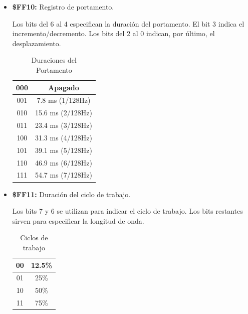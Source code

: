 	\begin{itemize}
		\item \textbf{\$FF10:} Registro de portamento.
	
		Los bits del 6 al 4 especifican la duración del portamento. El bit 3 indica el incremento/decremento.	Los bits del 2 al 0 indican, por último, el desplazamiento.
		
		\begin{table}[h!]
			\centering
			\begin{tabular}{|c|l|l|l|c|}
				\hline
				\multicolumn{4}{|c|}{000}       & Apagado                 				\\ \hline
				\multicolumn{4}{|c|}{001}       & 7.8 ms  (1/128Hz)                 				\\ \hline
				\multicolumn{4}{|c|}{010}       & 15.6 ms (2/128Hz) 					\\ \hline
				\multicolumn{4}{|c|}{011}       & 23.4 ms (3/128Hz) 					\\ \hline
				\multicolumn{4}{|c|}{100} 		& 31.3 ms (4/128Hz)              				\\ \hline
				\multicolumn{4}{|c|}{101} 		& 39.1 ms (5/128Hz) 					\\ \hline
				\multicolumn{4}{|c|}{110} 		& 46.9 ms (6/128Hz) 					\\ \hline
				\multicolumn{4}{|c|}{111} 		& 54.7 ms (7/128Hz) 					\\ \hline
			\end{tabular}
			\caption{Duraciones del Portamento}
			\label{table:portamento}
		\end{table}
		
		\item \textbf{\$FF11:} Duración del ciclo de trabajo.
	
		Los bits 7 y 6 se utilizan para indicar el ciclo de trabajo. Los bits restantes sirven para especificar la longitud de onda.
		
		\begin{table}[h!]
			\centering
			\begin{tabular}{|c|l|l|l|c|}
				\hline
				\multicolumn{4}{|c|}{00}       & 12.5\% 								\\ \hline
				\multicolumn{4}{|c|}{01}       & 25\% 									\\ \hline
				\multicolumn{4}{|c|}{10}       & 50\% 									\\ \hline
				\multicolumn{4}{|c|}{11}       & 75\%
				\\ \hline
			\end{tabular}
			\caption{Ciclos de trabajo}
			\label{table:cycle}
		\end{table} 	
		

\end{itemize}
